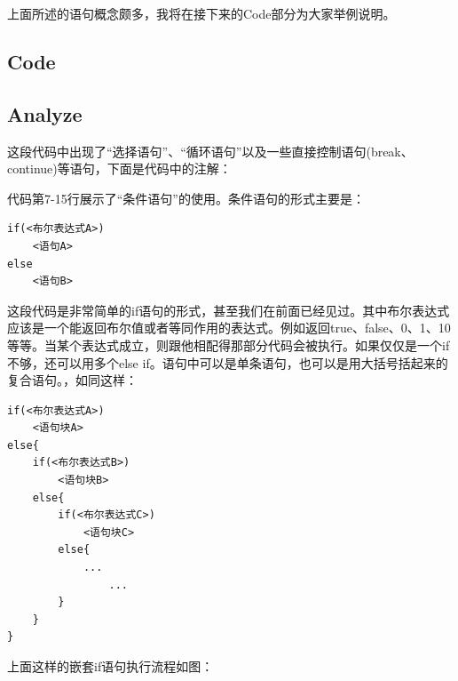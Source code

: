 上面所述的语句概念颇多，我将在接下来的Code部分为大家举例说明。

\subsection{Code}



\subsection{Analyze}
这段代码中出现了“选择语句”、“循环语句”以及一些直接控制语句(break、continue)等语句，下面是代码中的注解：
\showremarks

代码第7-15行展示了“条件语句”的使用。条件语句的形式主要是：

\begin{lstlisting}[xleftmargin=10em,xrightmargin=10em]
if(<布尔表达式A>)
    <语句A>
else
    <语句B>
\end{lstlisting}

这段代码是非常简单的if语句的形式，甚至我们在前面已经见过。其中布尔表达式应该是一个能返回布尔值或者等同作用的表达式。例如返回true、false、0、1、10等等。当某个表达式成立，则跟他相配得那部分代码会被执行。如果仅仅是一个if不够，还可以用多个else if。语句中可以是单条语句，也可以是用大括号括起来的复合语句。，如同这样：

\begin{lstlisting}[xleftmargin=6em,xrightmargin=6em]
if(<布尔表达式A>)
    <语句块A>
else{
    if(<布尔表达式B>)
        <语句块B>
    else{
        if(<布尔表达式C>)
            <语句块C>
        else{
            ...
                ...
        }
    }
}
\end{lstlisting}

上面这样的嵌套if语句执行流程如图：

